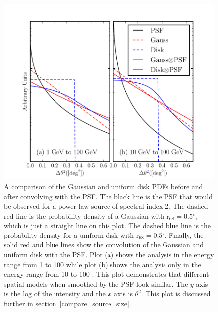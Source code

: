 \documentclass[12pt,preprint]{aastex}
\newcommand{\gev}{\text{GeV}\xspace}
\newcommand{\rsixeight}{{\ensuremath{\text{r}_{68}}}\xspace}
\renewcommand{\deg}{\ensuremath{^\circ}\xspace}
\begin{document}
\begin{figure}
  \begin{center}
    \includegraphics{mc_plots/compare_disk_gauss.pdf}
    \end{center}
    \caption{
    A comparison of the Gaussian and uniform disk PDFs before and
    after convolving with the PSF.  The black line is the PSF that
    would be observed for a power-law source of spectral index 2. The
    dashed red line is the probability density of a Gaussian with
    $\rsixeight=0.5\deg$, which is just a straight line on this plot.
    The dashed blue line is the probability density for a uniform disk
    with $\rsixeight=0.5\deg$.  Finally, the solid red and blue lines
    show the convolution of the Gaussian and uniform disk with the PSF.
    Plot (a) shows the analysis in the energy range from 1 \gev to 100
    \gev while plot (b) shows the analysis only in the energy range
    from 10 \gev to 100 \gev. This plot demonstrates that different
    spatial models when smoothed by the PSF look similar.  The $y$
    axis is the log of the intensity and the $x$ axis is $\theta^2$.
    This plot is discussed further in section~\ref{compare_source_size}.
    }\label{compare_disk_gauss}
  \end{figure}
\end{document}
